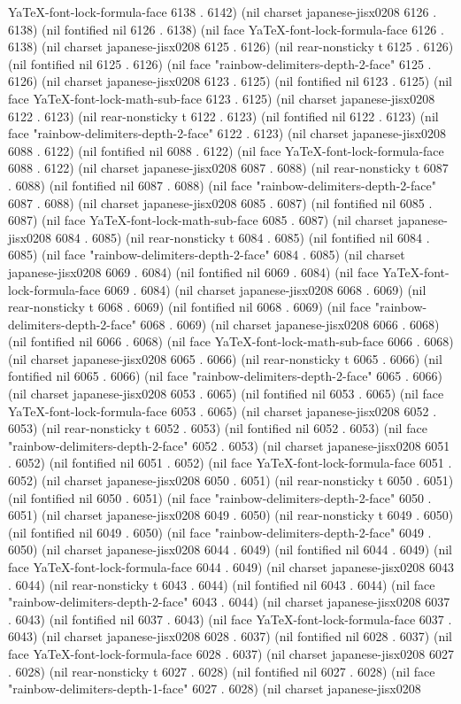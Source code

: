 YaTeX-font-lock-formula-face 6138 . 6142) (nil charset japanese-jisx0208 6126 . 6138) (nil fontified nil 6126 . 6138) (nil face YaTeX-font-lock-formula-face 6126 . 6138) (nil charset japanese-jisx0208 6125 . 6126) (nil rear-nonsticky t 6125 . 6126) (nil fontified nil 6125 . 6126) (nil face "rainbow-delimiters-depth-2-face" 6125 . 6126) (nil charset japanese-jisx0208 6123 . 6125) (nil fontified nil 6123 . 6125) (nil face YaTeX-font-lock-math-sub-face 6123 . 6125) (nil charset japanese-jisx0208 6122 . 6123) (nil rear-nonsticky t 6122 . 6123) (nil fontified nil 6122 . 6123) (nil face "rainbow-delimiters-depth-2-face" 6122 . 6123) (nil charset japanese-jisx0208 6088 . 6122) (nil fontified nil 6088 . 6122) (nil face YaTeX-font-lock-formula-face 6088 . 6122) (nil charset japanese-jisx0208 6087 . 6088) (nil rear-nonsticky t 6087 . 6088) (nil fontified nil 6087 . 6088) (nil face "rainbow-delimiters-depth-2-face" 6087 . 6088) (nil charset japanese-jisx0208 6085 . 6087) (nil fontified nil 6085 . 6087) (nil face YaTeX-font-lock-math-sub-face 6085 . 6087) (nil charset japanese-jisx0208 6084 . 6085) (nil rear-nonsticky t 6084 . 6085) (nil fontified nil 6084 . 6085) (nil face "rainbow-delimiters-depth-2-face" 6084 . 6085) (nil charset japanese-jisx0208 6069 . 6084) (nil fontified nil 6069 . 6084) (nil face YaTeX-font-lock-formula-face 6069 . 6084) (nil charset japanese-jisx0208 6068 . 6069) (nil rear-nonsticky t 6068 . 6069) (nil fontified nil 6068 . 6069) (nil face "rainbow-delimiters-depth-2-face" 6068 . 6069) (nil charset japanese-jisx0208 6066 . 6068) (nil fontified nil 6066 . 6068) (nil face YaTeX-font-lock-math-sub-face 6066 . 6068) (nil charset japanese-jisx0208 6065 . 6066) (nil rear-nonsticky t 6065 . 6066) (nil fontified nil 6065 . 6066) (nil face "rainbow-delimiters-depth-2-face" 6065 . 6066) (nil charset japanese-jisx0208 6053 . 6065) (nil fontified nil 6053 . 6065) (nil face YaTeX-font-lock-formula-face 6053 . 6065) (nil charset japanese-jisx0208 6052 . 6053) (nil rear-nonsticky t 6052 . 6053) (nil fontified nil 6052 . 6053) (nil face "rainbow-delimiters-depth-2-face" 6052 . 6053) (nil charset japanese-jisx0208 6051 . 6052) (nil fontified nil 6051 . 6052) (nil face YaTeX-font-lock-formula-face 6051 . 6052) (nil charset japanese-jisx0208 6050 . 6051) (nil rear-nonsticky t 6050 . 6051) (nil fontified nil 6050 . 6051) (nil face "rainbow-delimiters-depth-2-face" 6050 . 6051) (nil charset japanese-jisx0208 6049 . 6050) (nil rear-nonsticky t 6049 . 6050) (nil fontified nil 6049 . 6050) (nil face "rainbow-delimiters-depth-2-face" 6049 . 6050) (nil charset japanese-jisx0208 6044 . 6049) (nil fontified nil 6044 . 6049) (nil face YaTeX-font-lock-formula-face 6044 . 6049) (nil charset japanese-jisx0208 6043 . 6044) (nil rear-nonsticky t 6043 . 6044) (nil fontified nil 6043 . 6044) (nil face "rainbow-delimiters-depth-2-face" 6043 . 6044) (nil charset japanese-jisx0208 6037 . 6043) (nil fontified nil 6037 . 6043) (nil face YaTeX-font-lock-formula-face 6037 . 6043) (nil charset japanese-jisx0208 6028 . 6037) (nil fontified nil 6028 . 6037) (nil face YaTeX-font-lock-formula-face 6028 . 6037) (nil charset japanese-jisx0208 6027 . 6028) (nil rear-nonsticky t 6027 . 6028) (nil fontified nil 6027 . 6028) (nil face "rainbow-delimiters-depth-1-face" 6027 . 6028) (nil charset japanese-jisx0208 
